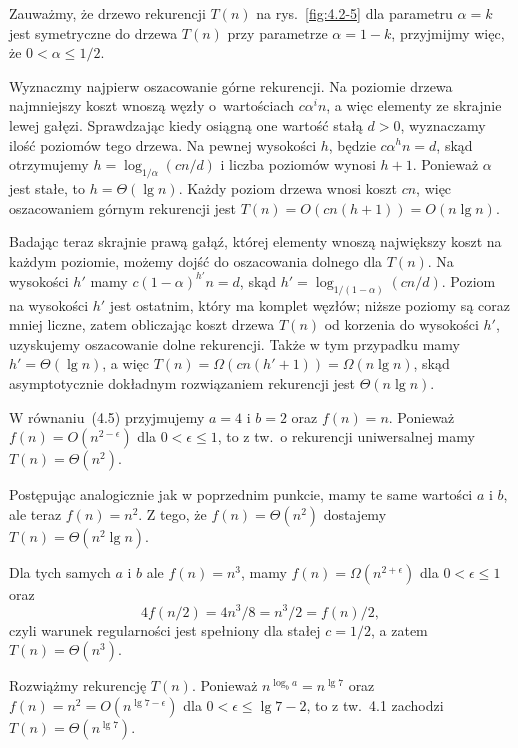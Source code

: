 Zauważmy, że drzewo rekurencji $T(n)$ na rys.~\ref{fig:4.2-5} dla parametru $\alpha=k$ jest symetryczne do drzewa $T(n)$ przy parametrze $\alpha=1-k$, przyjmijmy więc, że $0<\alpha\le1/2$.

Wyznaczmy najpierw oszacowanie górne rekurencji. Na  poziomie drzewa najmniejszy koszt wnoszą węzły o~wartościach $c\alpha^in$, a więc elementy ze skrajnie lewej gałęzi. Sprawdzając kiedy osiągną one wartość stałą $d>0$, wyznaczamy ilość poziomów tego drzewa. Na pewnej wysokości $h$, będzie $c\alpha^hn=d$, skąd otrzymujemy $h=\log_{1/\alpha}(cn/d)$ i liczba poziomów wynosi $h+1$. Ponieważ $\alpha$ jest stałe, to $h=\Theta(\lg n)$. Każdy poziom drzewa wnosi koszt $cn$, więc oszacowaniem górnym rekurencji jest $T(n)=O(cn(h+1))=O(n\lg n)$.

Badając teraz skrajnie prawą gałąź, której elementy wnoszą największy koszt na każdym poziomie, możemy dojść do oszacowania dolnego dla $T(n)$. Na wysokości $h'$ mamy $c(1-\alpha)^{h'}n=d$, skąd $h'=\log_{1/(1-\alpha)}(cn/d)$. Poziom na wysokości $h'$ jest ostatnim, który ma komplet węzłów; niższe poziomy są coraz mniej liczne, zatem obliczając koszt drzewa $T(n)$ od korzenia do wysokości $h'$, uzyskujemy oszacowanie dolne rekurencji. Także w tym przypadku mamy $h'=\Theta(\lg n)$, a więc $T(n)=\Omega(cn(h'+1))=\Omega(n\lg n)$, skąd asymptotycznie dokładnym rozwiązaniem rekurencji jest $\Theta(n\lg n)$.


\exercise %

\subexercise
W równaniu~(4.5) przyjmujemy $a=4$ i $b=2$ oraz $f(n)=n$. Ponieważ $f(n)=O(n^{2-\epsilon})$ dla $0<\epsilon\le1$, to z tw.~o rekurencji uniwersalnej mamy $T(n)=\Theta(n^2)$.

\subexercise
Postępując analogicznie jak w poprzednim punkcie, mamy te same wartości $a$ i $b$, ale teraz $f(n)=n^2$. Z tego, że $f(n)=\Theta(n^2)$ dostajemy $T(n)=\Theta(n^2\lg n)$.

\subexercise
Dla tych samych $a$ i $b$ ale $f(n)=n^3$, mamy $f(n)=\Omega(n^{2+\epsilon})$ dla $0<\epsilon\le1$ oraz
\[
	4f(n/2) = 4n^3\!/8 = n^3\!/2 = f(n)/2,
\]
czyli warunek regularności jest spełniony dla stałej $c=1/2$, a zatem $T(n)=\Theta(n^3)$.

\exercise %
Rozwiążmy rekurencję $T(n)$. Ponieważ $n^{\log_ba}=n^{\lg7}$ oraz $f(n)=n^2=O(n^{\lg7-\epsilon})$ dla $0<\epsilon\le\lg7-2$, to z tw.~4.1 zachodzi $T(n)=\Theta(n^{\lg7})$.

